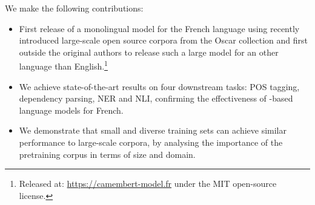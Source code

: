 We make the following contributions:
\begin{itemize}
    \item First release of a monolingual \roberta model for the French language using recently introduced large-scale open source corpora from the Oscar collection and first outside the original \bert authors to release such a large model for an other language than English.\footnote{Released at:
              \mbox{\url{https://camembert-model.fr}} under the MIT open-source license.}

    \item We achieve state-of-the-art results on four downstream tasks: POS tagging, dependency parsing, NER and NLI, confirming the effectiveness of \bert-based language models for French.
    \item We demonstrate that small and diverse training sets can achieve similar performance to large-scale corpora, by analysing the importance of the pretraining corpus in terms of size and domain.%
\end{itemize}


